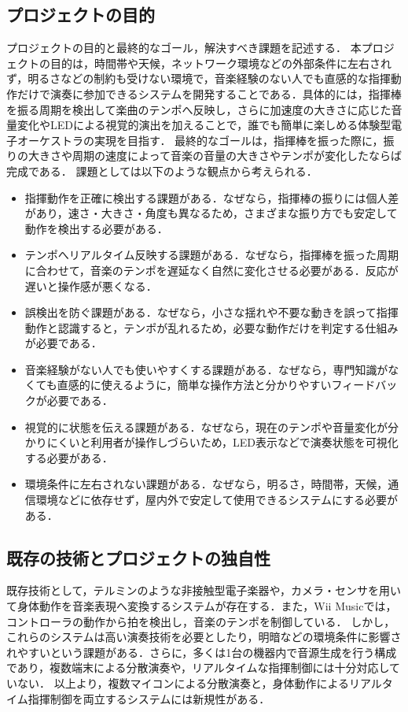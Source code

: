 \documentclass[lualatex,book,paper=a4paper,jafontsize=11.5pt,jafontscale=1.05]{jlreq}
\begin{document}
\subsection{プロジェクトの目的}
プロジェクトの目的と最終的なゴール，解決すべき課題を記述する．
本プロジェクトの目的は，時間帯や天候，ネットワーク環境などの外部条件に左右されず，明るさなどの制約も受けない環境で，音楽経験のない人でも直感的な指揮動作だけで演奏に参加できるシステムを開発することである．具体的には，指揮棒を振る周期を検出して楽曲のテンポへ反映し，さらに加速度の大きさに応じた音量変化やLEDによる視覚的演出を加えることで，誰でも簡単に楽しめる体験型電子オーケストラの実現を目指す．
最終的なゴールは，指揮棒を振った際に，振りの大きさや周期の速度によって音楽の音量の大きさやテンポが変化したならば完成である．
課題としては以下のような観点から考えられる．
\begin{itemize}
 \item 指揮動作を正確に検出する課題がある．なぜなら，指揮棒の振りには個人差があり，速さ・大きさ・角度も異なるため，さまざまな振り方でも安定して動作を検出する必要がある．
 \item テンポへリアルタイム反映する課題がある．なぜなら，指揮棒を振った周期に合わせて，音楽のテンポを遅延なく自然に変化させる必要がある．反応が遅いと操作感が悪くなる．
 \item 誤検出を防ぐ課題がある．なぜなら，小さな揺れや不要な動きを誤って指揮動作と認識すると，テンポが乱れるため，必要な動作だけを判定する仕組みが必要である．
 \item 音楽経験がない人でも使いやすくする課題がある．なぜなら，専門知識がなくても直感的に使えるように，簡単な操作方法と分かりやすいフィードバックが必要である．
 \item 視覚的に状態を伝える課題がある．なぜなら，現在のテンポや音量変化が分かりにくいと利用者が操作しづらいため，LED表示などで演奏状態を可視化する必要がある．
 \item 環境条件に左右されない課題がある．なぜなら，明るさ，時間帯，天候，通信環境などに依存せず，屋内外で安定して使用できるシステムにする必要がある．
\end{itemize}

\subsection{既存の技術とプロジェクトの独自性}
既存技術として，テルミンのような非接触型電子楽器や，カメラ・センサを用いて身体動作を音楽表現へ変換するシステムが存在する\cite{teru}．また，Wii Music\cite{ninntenndo}では，コントローラの動作から拍を検出し，音楽のテンポを制御している．
しかし，これらのシステムは高い演奏技術を必要としたり，明暗などの環境条件に影響されやすいという課題がある．さらに，多くは1台の機器内で音源生成を行う構成であり，複数端末による分散演奏や，リアルタイムな指揮制御には十分対応していない．
以上より，複数マイコンによる分散演奏と，身体動作によるリアルタイム指揮制御を両立するシステムには新規性がある．
\end{document}
